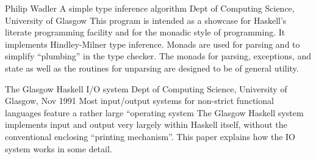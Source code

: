 {Philip Wadler}
{A simple type inference algorithm}
{Dept of Computing Science, University of Glasgow}
{
This program is intended as a showcase for Haskell's
literate programming facility and for the monadic style
of programming.  It implements Hindley-Milner type inference.
Monads are used for parsing and to simplify ``plumbing'' in the type
checker. The monads for parsing, exceptions, and state as well
as the routines for unparsing are designed to be of general utility.
}
 
{The Glasgow Haskell I/O system}
{Dept of Computing Science, University of Glasgow, Nov 1991}
{
Most input/output systems for non-strict functional languages
feature a rather large ``operating system
The Glasgow Haskell system implements input and output
very largely within Haskell itself, without the conventional
enclosing ``printing mechanism''.  This paper explains how the 
IO system works in some detail.
}




